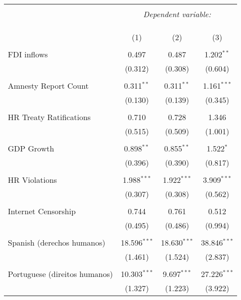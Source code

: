 
\begin{table}[!htbp] \centering 
  \caption{} 
  \label{} 
\begin{tabular}{@{\extracolsep{5pt}}lccc} 
\\[-1.8ex]\hline 
\hline \\[-1.8ex] 
 & \multicolumn{3}{c}{\textit{Dependent variable:}} \\ 
\cline{2-4} 
\\[-1.8ex] & \multicolumn{3}{c}{ } \\ 
\\[-1.8ex] & (1) & (2) & (3)\\ 
\hline \\[-1.8ex] 
 FDI inflows & 0.497 & 0.487 & 1.202$^{**}$ \\ 
  & (0.312) & (0.308) & (0.604) \\ 
  & & & \\ 
 Amnesty Report Count & 0.311$^{**}$ & 0.311$^{**}$ & 1.161$^{***}$ \\ 
  & (0.130) & (0.139) & (0.345) \\ 
  & & & \\ 
 HR Treaty Ratifications & 0.710 & 0.728 & 1.346 \\ 
  & (0.515) & (0.509) & (1.001) \\ 
  & & & \\ 
 GDP Growth & 0.898$^{**}$ & 0.855$^{**}$ & 1.522$^{*}$ \\ 
  & (0.396) & (0.390) & (0.817) \\ 
  & & & \\ 
 HR Violations & 1.988$^{***}$ & 1.922$^{***}$ & 3.909$^{***}$ \\ 
  & (0.307) & (0.308) & (0.562) \\ 
  & & & \\ 
 Internet Censorship & 0.744 & 0.761 & 0.512 \\ 
  & (0.495) & (0.486) & (0.994) \\ 
  & & & \\ 
 Spanish (derechos humanos) & 18.596$^{***}$ & 18.630$^{***}$ & 38.846$^{***}$ \\ 
  & (1.461) & (1.524) & (2.837) \\ 
  & & & \\ 
 Portuguese (direitos humanos) & 10.303$^{***}$ & 9.697$^{***}$ & 27.226$^{***}$ \\ 
  & (1.327) & (1.223) & (3.922) \\ 

\end{tabular}
\end{table}
